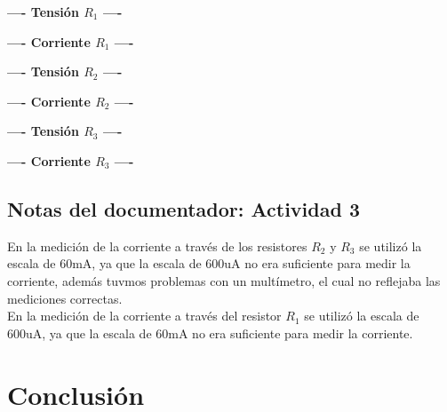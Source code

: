         \begin{center} \textbf{---- Tensión $R_1$ ----} \end{center}
        \begin{center} \textbf{---- Corriente $R_1$ ----} \end{center}
        \columnbreak{}
        \begin{center} \textbf{---- Tensión $R_2$ ----} \end{center}
        \begin{center} \textbf{---- Corriente $R_2$ ----} \end{center}
        \saltoPag{}
        \begin{center} \textbf{---- Tensión $R_3$ ----} \end{center}
        \begin{center} \textbf{---- Corriente $R_3$ ----} \end{center}

\subsection{Notas del documentador: Actividad 3}
    \sangria{} En la medición de la corriente a través de los resistores $R_2$ y $R_3$ se utilizó la escala de 60mA, ya que la escala de 600uA no era suficiente para medir la corriente, además tuvmos problemas con un multímetro, el cual no reflejaba las mediciones correctas.\\
    \sangria{} En la medición de la corriente a través del resistor $R_1$ se utilizó la escala de 600uA, ya que la escala de 60mA no era suficiente para medir la corriente.\\


\section{Conclusión}

